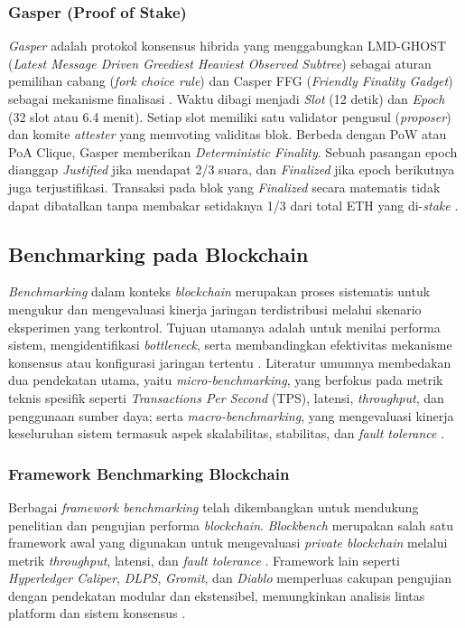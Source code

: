 \subsubsection{Gasper (Proof of Stake)}
\textit{Gasper} adalah protokol konsensus hibrida yang menggabungkan LMD-GHOST (\textit{Latest Message Driven Greediest Heaviest Observed Subtree}) sebagai aturan pemilihan cabang (\textit{fork choice rule}) dan Casper FFG (\textit{Friendly Finality Gadget}) sebagai mekanisme finalisasi \cite{buterin2020}. Waktu dibagi menjadi \textit{Slot} (12 detik) dan \textit{Epoch} (32 slot atau 6.4 menit). Setiap slot memiliki satu validator pengusul (\textit{proposer}) dan komite \textit{attester} yang memvoting validitas blok. Berbeda dengan PoW atau PoA Clique, Gasper memberikan \textit{Deterministic Finality}. Sebuah pasangan epoch dianggap \textit{Justified} jika mendapat 2/3 suara, dan \textit{Finalized} jika epoch berikutnya juga terjustifikasi. Transaksi pada blok yang \textit{Finalized} secara matematis tidak dapat dibatalkan tanpa membakar setidaknya 1/3 dari total ETH yang di-\textit{stake} \cite{saltini2021}.

\subsection{Benchmarking pada Blockchain}

\textit{Benchmarking} dalam konteks \textit{blockchain} merupakan proses sistematis untuk mengukur dan mengevaluasi kinerja jaringan terdistribusi melalui skenario eksperimen yang terkontrol. Tujuan utamanya adalah untuk menilai performa sistem, mengidentifikasi \textit{bottleneck}, serta membandingkan efektivitas mekanisme konsensus atau konfigurasi jaringan tertentu \cite{fan2020, dinh2017, thakkar2018}. Literatur umumnya membedakan dua pendekatan utama, yaitu \textit{micro-benchmarking}, yang berfokus pada metrik teknis spesifik seperti \textit{Transactions Per Second} (TPS), latensi, \textit{throughput}, dan penggunaan sumber daya; serta \textit{macro-benchmarking}, yang mengevaluasi kinerja keseluruhan sistem termasuk aspek skalabilitas, stabilitas, dan \textit{fault tolerance} \cite{dinh2017, nasrulin2022, gramoli2023}.

\subsubsection{Framework Benchmarking Blockchain}

Berbagai \textit{framework benchmarking} telah dikembangkan untuk mendukung penelitian dan pengujian performa \textit{blockchain}. \textit{Blockbench} merupakan salah satu framework awal yang digunakan untuk mengevaluasi \textit{private blockchain} melalui metrik \textit{throughput}, latensi, dan \textit{fault tolerance} \cite{dinh2017}. Framework lain seperti \textit{Hyperledger Caliper}, \textit{DLPS}, \textit{Gromit}, dan \textit{Diablo} memperluas cakupan pengujian dengan pendekatan modular dan ekstensibel, memungkinkan analisis lintas platform dan sistem konsensus \cite{fan2020, gramoli2023, sedlmeir2021}. 

